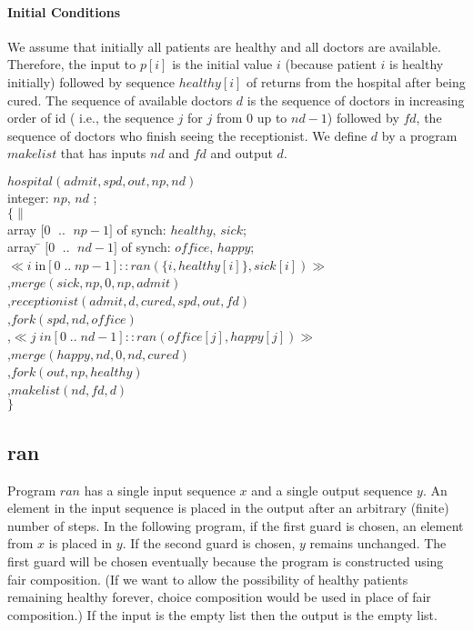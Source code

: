 \paragraph{Initial Conditions}
We assume that initially all patients are healthy and all doctors
are available.
Therefore, the input to $p[i]$ is the initial value $i$ (because patient
$i$ is healthy initially) followed by sequence $healthy[i]$ of returns
from the hospital after being cured.
The sequence of available doctors $d$ is the sequence of doctors in
increasing order of id ( i.e., the sequence $j$ for $j$ from 0 up to
$nd-1$) followed by $fd$, the sequence of doctors who finish seeing the
receptionist.
We define $d$ by a program $makelist$ that has inputs $nd$ and $fd$
and output $d$.



\begin{tabbing}
$hospital(admit, spd, out, np, nd)$ \\
integer: $np$, $nd$ ; \\
$\{ \|$ \= \\
     \> array $[ 0 \;$ .. $\; np-1]$ of synch: 
         $healthy$, $sick$; \\
     \> array  \= $[ 0 \;$  .. $\;  nd-1]$ of synch: 
                  $office$, $happy$; \\
  \>   \> $\ll i \; $in$ [0 \; .. \; np-1] :: 
  ran( \{ i , healthy[i] \} , sick[i]) \gg$ \\
  \>   \> ,$merge(sick,np,0,np,admit)$ \\
  \>  \>  ,$receptionist(admit,d,cured,spd,out,fd)$  \\
  \>  \>  ,$fork(spd,nd,office)$  \\
  \>  \>  ,$\ll j  \; in [ 0 \; .. \; nd-1] :: 
                   ran(office[j],happy[j]) \gg$ \\
  \>   \> ,$merge(happy,nd,0,nd,cured)$ \\
  \>   \> ,$fork(out,np,healthy)$ \\
  \>   \> ,$makelist(nd,fd,d)$ \\
$\}$
\end{tabbing}

\subsection{ran}
Program $ran$ has a single input sequence $x$ and a single output sequence $y$.
An element in the input sequence is placed in the output after 
an arbitrary (finite) number of steps.
In the following program, if the first guard is chosen, an element 
from $x$ is placed in $y$.
If the second guard is chosen, $y$ remains unchanged.
The first guard will be chosen eventually because the program is constructed
using fair composition.
(If we want to allow the possibility of healthy patients remaining
healthy forever, choice composition would be used in place of fair
composition.)
If the input is the empty list then the output is the empty list.


